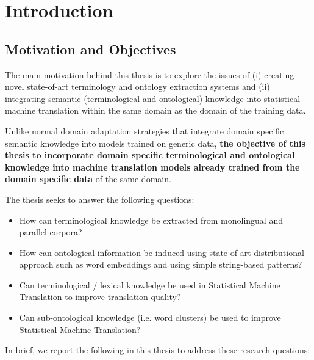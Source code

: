 \chapter{Introduction}
\label{chap:intro}

\section{Motivation and Objectives}

The main motivation behind this thesis is to explore the issues of (i) creating novel state-of-art terminology and ontology extraction systems and (ii) integrating semantic (terminological and ontological) knowledge into  statistical machine translation within the same domain as the domain of the training data. 

Unlike normal domain adaptation strategies that integrate domain specific semantic knowledge into models trained on generic data, \textbf{the objective of this thesis to incorporate domain specific terminological and ontological knowledge into machine translation models already trained from the domain specific data} of the same domain.

\noindent The thesis seeks to answer the following questions:

\begin{itemize}[noitemsep]
\item How can terminological knowledge be extracted from monolingual and parallel corpora?
\item How can ontological information be induced using state-of-art distributional approach such as word embeddings and using simple string-based patterns?
\item Can terminological / lexical knowledge be used in Statistical Machine Translation to improve translation quality?
\item Can sub-ontological knowledge (i.e. word clusters) be used to improve Statistical Machine Translation? 
\end{itemize}


In brief, we report the following in this thesis to address these research questions:

